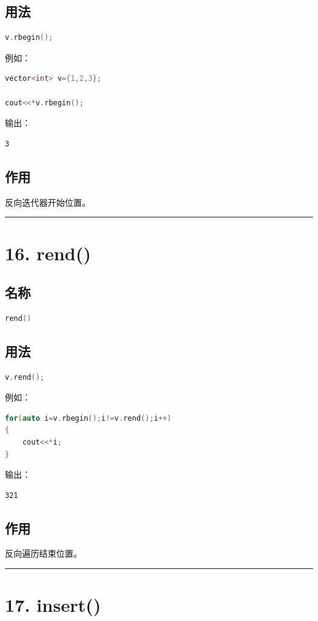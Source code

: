 \documentclass[9pt,twocolumn]{extarticle}
\begin{document}
\subsection{用法}
\begin{lstlisting}[language=C++]
v.rbegin();
\end{lstlisting}
例如：
\begin{lstlisting}[language=C++]
vector<int> v={1,2,3};

cout<<*v.rbegin();
\end{lstlisting}
输出：
\begin{lstlisting}
3
\end{lstlisting}

\subsection{作用}
反向迭代器开始位置。

\noindent\rule{\linewidth}{0.4pt}

\section{16. rend()}

\subsection{名称}
\begin{lstlisting}[language=C++]
rend()
\end{lstlisting}

\subsection{用法}
\begin{lstlisting}[language=C++]
v.rend();
\end{lstlisting}
例如：
\begin{lstlisting}[language=C++]
for(auto i=v.rbegin();i!=v.rend();i++)
{
    cout<<*i;
}
\end{lstlisting}
输出：
\begin{lstlisting}
321
\end{lstlisting}

\subsection{作用}
反向遍历结束位置。

\noindent\rule{\linewidth}{0.4pt}

\section{17. insert()}
\end{document}
